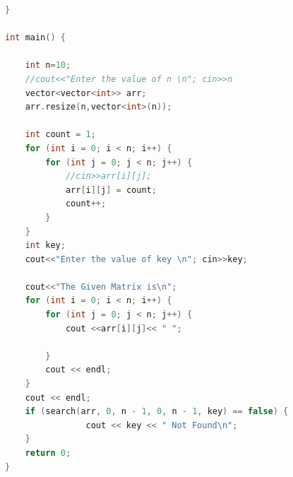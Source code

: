 \documentclass[conference]{IEEEtran}
\begin{document}
\begin{titlepage}
\begin{lstlisting}[language=C++,caption=Code for this paper]
}

int main() {
    
    int n=10; 
    //cout<<"Enter the value of n \n"; cin>>n
    vector<vector<int>> arr;
    arr.resize(n,vector<int>(n));

    int count = 1;
    for (int i = 0; i < n; i++) {
        for (int j = 0; j < n; j++) {
            //cin>>arr[i][j];
            arr[i][j] = count;
            count++;
        }
    }
    int key; 
    cout<<"Enter the value of key \n"; cin>>key;

    cout<<"The Given Matrix is\n";
    for (int i = 0; i < n; i++) {
        for (int j = 0; j < n; j++) {
            cout <<arr[i][j]<< " ";
            
        }
        cout << endl;
    }
    cout << endl;
    if (search(arr, 0, n - 1, 0, n - 1, key) == false) {
                cout << key << " Not Found\n";
    }
    return 0;
}
\end{lstlisting}
\end{titlepage}
\end{document}
